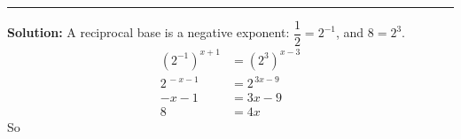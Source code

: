 \documentclass[12pt]{article}
\begin{document}
\vspace{0.15cm}\noindent\rule{\linewidth}{0.2pt}


\textbf{Solution:} A reciprocal base is a negative exponent: $\dfrac{1}{2} = 2^{-1}$, and $8 = 2^{3}$.
\begin{align*}
  \left(2^{-1}\right)^{x+1} &= \left(2^{3}\right)^{x-3} \\
  2^{\,-x-1} &= 2^{\,3x-9} \\
  -x - 1 &= 3x - 9 \\
  8 &= 4x
\end{align*}
So 
\end{document}
